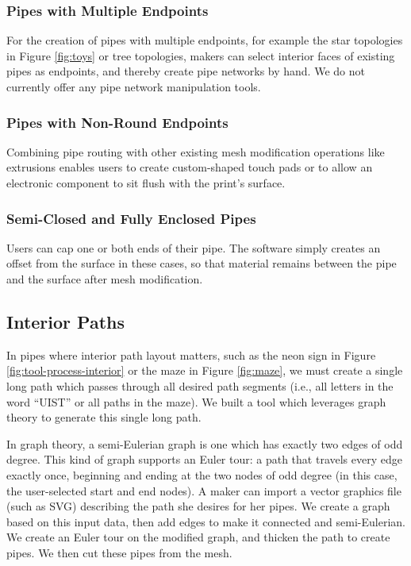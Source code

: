 \subsubsection{Pipes with Multiple Endpoints}
For the creation of pipes with multiple endpoints, for example the star topologies in Figure \ref{fig:toys} or tree topologies, makers can select interior faces of existing pipes as endpoints, and thereby create pipe networks by hand.  We do not currently offer any pipe network manipulation tools.


\subsubsection{Pipes with Non-Round Endpoints}
Combining pipe routing with other existing mesh modification operations like extrusions enables users to create custom-shaped touch pads or to allow an electronic component to sit flush with the print's surface.

\subsubsection{Semi-Closed and Fully Enclosed Pipes}
Users can cap one or both ends of their pipe.  The software simply creates an offset from the surface in these cases, so that material remains between the pipe and the surface after mesh modification.

\subsection{Interior Paths}

In pipes where interior path layout matters, such as the neon sign in Figure \ref{fig:tool-process-interior} or the maze in Figure \ref{fig:maze}, we must create a single long path which passes through all desired path segments (i.e., all letters in the word ``UIST'' or all paths in the maze).  We built a tool which leverages graph theory to generate this single long path.

In graph theory, a semi-Eulerian graph is one which has exactly two edges of odd degree.  This kind of graph supports an Euler tour: a path that travels every edge exactly once, beginning and ending at the two nodes of odd degree (in this case, the user-selected start and end nodes).  A maker can import a vector graphics file (such as SVG) describing the path she desires for her pipes.  We create a graph based on this input data, then add edges to make it connected and semi-Eulerian.  We create an Euler tour on the modified graph, and thicken the path to create pipes.  We then cut these pipes from the mesh.

